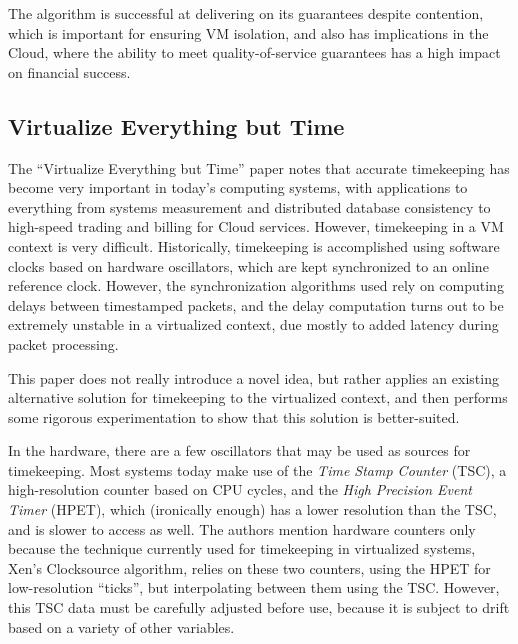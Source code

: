 \documentclass[letterpaper, twocolumn]{article}
\begin{document}
The algorithm is successful at delivering on its guarantees despite contention,
which is important for ensuring VM isolation, and also has implications in the Cloud,
where the ability to meet quality-of-service guarantees has a high impact on
financial success.

\subsection{Virtualize Everything but Time}
\label{sec:summaries/time}

The ``Virtualize Everything but Time'' paper \cite{ref:time} notes that accurate
timekeeping has become very important in today's computing systems, with
applications to everything from systems measurement and distributed database
consistency to high-speed trading and billing for Cloud services.  However, 
timekeeping in a VM context is very difficult.  Historically, timekeeping
is accomplished using software clocks based on hardware oscillators, which
are kept synchronized to an online
reference clock.  However, the synchronization algorithms used rely on
computing delays between timestamped packets, and the delay computation
turns out to be extremely unstable in a virtualized context, due mostly
to added latency during packet processing.

This paper does not really introduce a novel idea, but rather applies
an existing alternative solution for timekeeping to the virtualized context,
and then performs some rigorous experimentation to show that this solution
is better-suited.

In the hardware, there are a few oscillators that may be used as sources
for timekeeping.  Most systems today make use of the \emph{Time Stamp Counter}
(TSC), a high-resolution counter based on CPU cycles, and the
\emph{High Precision Event Timer} (HPET), which (ironically enough) has a
lower resolution than the TSC, and is slower to access as well.  The authors
mention hardware counters only because the technique currently used for timekeeping
in virtualized systems, Xen's Clocksource algorithm, relies on these two counters,
using the HPET for low-resolution ``ticks'', but interpolating between them using
the TSC.  However, this TSC data must be carefully adjusted before use, because
it is subject to drift based on a variety of other variables.
\end{document}
